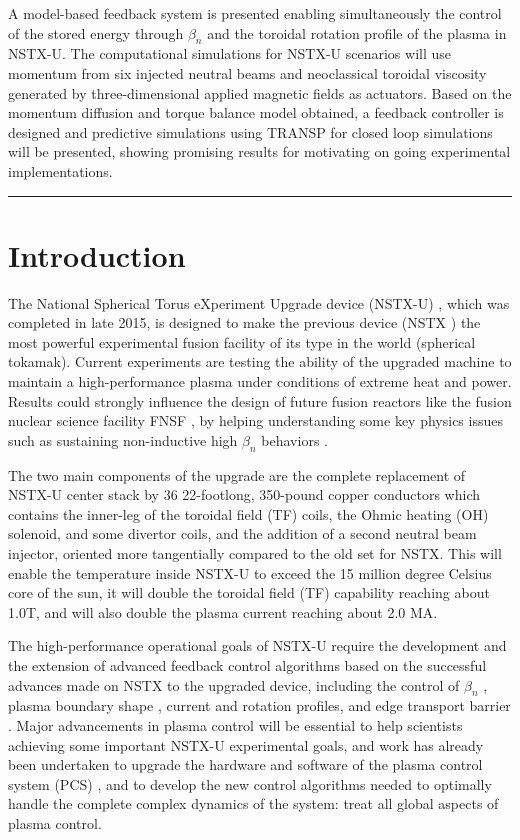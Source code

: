 \documentclass[12pt,lot, lof]{puthesis}
\begin{document}
\noindent
A model-based feedback system is presented enabling simultaneously the control of the stored energy through $\beta_n$  and the toroidal rotation profile of the plasma in NSTX-U. The computational simulations for NSTX-U scenarios will use momentum from six injected neutral beams and neoclassical toroidal viscosity generated by three-dimensional applied magnetic fields as actuators. Based on the momentum diffusion and torque balance model obtained, a feedback controller is designed and predictive simulations using TRANSP for closed loop simulations will be presented, showing promising results for motivating on going experimental implementations. \\

\hrule


\section{Introduction}
%
The National Spherical Torus eXperiment Upgrade device (NSTX-U) \cite{Menard12}, which was completed in late 2015, is designed to make the previous device (NSTX \cite{Ono00}) the most powerful experimental fusion facility of its type in the world (spherical tokamak). Current experiments are testing the ability of the upgraded machine to maintain a high-performance plasma under conditions of extreme heat and power. Results could strongly influence the design of future fusion reactors like the fusion nuclear science facility FNSF \cite{Peng05, Peng11, Peng09}, by helping understanding some key physics issues such as sustaining non-inductive high $\beta_n$ behaviors \cite{Gates07, Menard07, Gates09, Gerhardt11, Buttery04, Chapman11}.

The two main components of the upgrade are the complete replacement of NSTX-U center stack by 36 22-footlong, 350-pound copper conductors which contains the inner-leg of the toroidal field (TF) coils, the Ohmic heating (OH) solenoid, and some divertor coils, and the addition of a second neutral beam injector, oriented more tangentially compared to the old set for NSTX. This will enable the temperature inside NSTX-U to exceed the 15 million degree Celsius core of the sun, it will double the toroidal field (TF) capability reaching about 1.0T, and will also double the plasma current reaching about 2.0 MA. 

The high-performance operational goals of NSTX-U require the development and the extension of advanced feedback control algorithms based on the successful advances made on NSTX to the upgraded device, including the control of $\beta_n$ \cite{Gerhardt12}, plasma boundary shape \cite{Gates06, Kolemen11}, current \cite{Boyer15} and rotation \cite{Goumiri15}  profiles, and edge transport barrier \cite{Kolemen10}. Major advancements in plasma control will be essential to help scientists achieving some important NSTX-U experimental goals, and work has already been undertaken to upgrade the hardware and software of the plasma control system (PCS) \cite{Erickson14}, and to develop the new control algorithms needed to optimally handle the complete complex dynamics of the system: treat all global aspects of plasma control.
\end{document}
